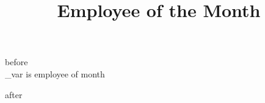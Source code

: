 \documentclass[10pt,a4paper,landscape]{letter}
\title{Employee of the Month}
\begin{document}
before\\
\my_var is employee of month \par
after
\end{document}
